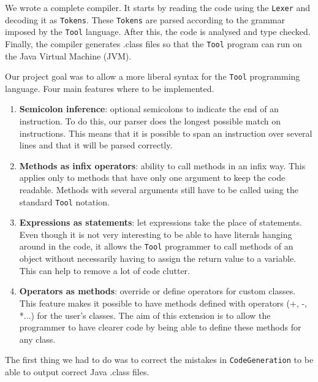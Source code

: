 We wrote a complete compiler. It starts by reading the code using the \lstinline$Lexer$ and decoding it as \lstinline$Tokens$. These \lstinline$Tokens$ are parsed according to the grammar imposed by the \lstinline$Tool$ language. After this, the code is analysed and type checked. Finally, the compiler generates .class files so that the \lstinline$Tool$ program can run on the Java Virtual Machine (JVM).

Our project goal was to allow a more liberal syntax for the \lstinline$Tool$ programming language. Four main features where to be implemented.

\begin{enumerate}
    \item \textbf{Semicolon inference}: optional semicolons to indicate the end of an instruction. To do this, our parser does the longest possible match on instructions. This means that it is possible to span an instruction over several lines and that it will be parsed correctly.
    \item \textbf{Methods as infix operators}: ability to call methods in an infix way. This applies only to methods that have only one argument to keep the code readable. Methods with several arguments still have to be called using the standard \lstinline$Tool$ notation.
    \item \textbf{Expressions as statements}: let expressions take the place of statements. Even though it is not very interesting to be able to have literals hanging around in the code, it allows the \lstinline$Tool$ programmer to call methods of an object without necessarily having to assign the return value to a variable. This can help to remove a lot of code clutter.
    \item \textbf{Operators as methods}: override or define operators for custom classes. This feature makes it possible to have methods defined with operators (+, -, *...) for the user's classes. The aim of this extension is to allow the programmer to have clearer code by being able to define these methods for any class.
\end{enumerate}

The first thing we had to do was to correct the mistakes in \lstinline$CodeGeneration$ to be able to output correct Java .class files.